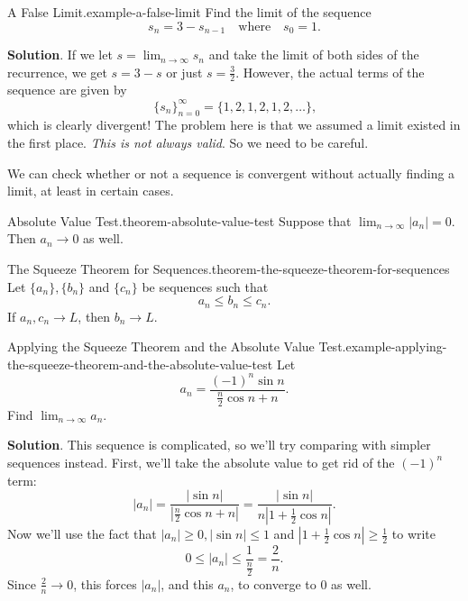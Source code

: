 \documentclass[10pt,]{book}
\numberwithin{equation}{section}
\begin{document}
\begin{example}{A False Limit.}{example-a-false-limit}%
\hypertarget{p-812}{}%
Find the limit of the sequence%
\begin{equation*}
s_{n} = 3 - s_{n - 1}\quad\text{where}\quad s_{0} = 1\text{.}
\end{equation*}
%
\par\smallskip%
\noindent\textbf{Solution}.\hypertarget{solution-168}{}\quad%
\hypertarget{p-813}{}%
If we let \(s = \lim_{n\to\infty}s_{n}\) and take the limit of both sides of the recurrence, we get \(s = 3 - s\) or just \(s = \frac{3}{2}\). However, the actual terms of the sequence are given by%
\begin{equation*}
\{s_{n}\}_{n=0}^{\infty} = \{1, 2, 1, 2, 1, 2, \ldots\}\text{,}
\end{equation*}
which is clearly divergent! The problem here is that we assumed a limit existed in the first place. \emph{This is not always valid}. So we need to be careful.%
\end{example}
\hypertarget{p-814}{}%
We can check whether or not a sequence is convergent without actually finding a limit, at least in certain cases.%
\begin{theorem}{Absolute Value Test.}{}{theorem-absolute-value-test}%
\hypertarget{p-815}{}%
Suppose that \(\lim_{n\to\infty}|a_{n}| = 0\). Then \(a_{n}\to0\) as well.%
\end{theorem}
\begin{theorem}{The Squeeze Theorem for Sequences.}{}{theorem-the-squeeze-theorem-for-sequences}%
\hypertarget{p-816}{}%
Let \(\{a_{n}\}, \{b_{n}\}\) and \(\{c_{n}\}\) be sequences such that%
\begin{equation*}
a_{n} \leq b_{n} \leq c_{n}\text{.}
\end{equation*}
If \(a_{n},c_{n}\to L\), then \(b_{n}\to L\).%
\end{theorem}
\begin{example}{Applying the Squeeze Theorem and the Absolute Value Test.}{example-applying-the-squeeze-theorem-and-the-absolute-value-test}%
\hypertarget{p-817}{}%
Let%
\begin{equation*}
a_{n} = \frac{(-1)^{n}\sin n}{\frac{n}{2}\cos n + n}\text{.}
\end{equation*}
Find \(\lim_{n\to\infty}a_{n}\).%
\par\smallskip%
\noindent\textbf{Solution}.\hypertarget{solution-169}{}\quad%
\hypertarget{p-818}{}%
This sequence is complicated, so we'll try comparing with simpler sequences instead. First, we'll take the absolute value to get rid of the \((-1)^{n}\) term:%
\begin{equation*}
|a_{n}| = \frac{|\sin n|}{\left|\frac{n}{2}\cos n + n\right|} = \frac{|\sin n|}{n\left|1 + \frac{1}{2}\cos n\right|}\text{.}
\end{equation*}
Now we'll use the fact that \(|a_{n}|\geq 0, |\sin n| \leq 1\) and \(\left|1 + \frac{1}{2}\cos n\right| \geq \frac{1}{2}\) to write%
\begin{equation*}
0\leq |a_{n}| \leq \frac{1}{\frac{n}{2}} = \frac{2}{n}\text{.}
\end{equation*}
Since \(\frac{2}{n}\to 0\), this forces \(|a_{n}|\), and this \(a_{n}\), to converge to \(0\) as well.%
\end{example}
\end{document}

